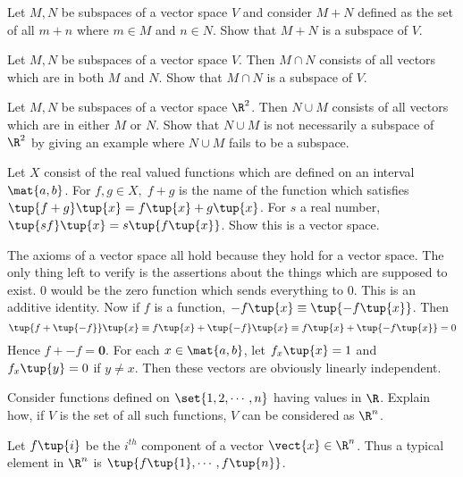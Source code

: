 \begin{enumialphparenastyle}
\begin{ex} Let $M,N$ be subspaces of a vector space $V$ and consider $M+N$
defined as the set of all $m+n$ where $m\in M$ and $n\in N$. Show that $M+N$
is a subspace of $V$.
\end{ex}

\begin{ex} Let $M,N$ be subspaces of a vector space $V$. Then $M\cap N$ consists
of all vectors which are in both $M$ and $N$. Show that $M\cap N$ is a
subspace of $V$.
\end{ex}

\begin{ex} Let $M,N$ be subspaces of a vector space $\R^{2}$. Then $N\cup
M$ consists of all vectors which are in either $M$ or $N$. Show that $N\cup
M $ is not necessarily a subspace of $\R^{2}$ by giving an example
where $N\cup M$ fails to be a subspace.
\end{ex}


\begin{ex} \label{4-july-prob1}Let $X$ consist of the real valued functions which
are defined on an interval $\mat{a,b}$. For $f,g\in X,\;f+g$ is the
name of the function which satisfies $\tup{f+g} \tup{x}
=f\tup{x} +g\tup{x}$. For $s$ a real number, $
\tup{s f} \tup{x} = s \tup{f\tup{x}
}$. Show this is a vector space. 
\begin{sol}
The axioms of a vector space all hold because they
hold for a vector space. The only thing left to verify is the
assertions about the things which are supposed to exist. $0$ would
be the zero function which sends everything to $0$. This is an additive
identity. Now if $f$ is a function, $-f\tup{x} \equiv \tup{
-f\tup{x} }$. Then
\[
\tup{f+\tup{-f} } \tup{x} \equiv f\tup{x}
+\tup{-f} \tup{x} \equiv f\tup{x} +\tup{-f\tup{
x} } =0
\]
Hence $f+-f=\mathbf{0}$. For each $x\in \mat{a,b}$, let $%
f_{x}\tup{x} =1$ and $f_{x}\tup{y} =0$ if $y\neq x$. Then
these vectors are obviously linearly independent.
\end{sol}
\end{ex}

\begin{ex} Consider functions defined on $\set{1,2,\cdots ,n} $ having
values in $\R$. Explain how, if $V$ is the set of all such
functions, $V$ can be considered as $\R^{n}$.
\begin{sol}
Let $f\tup{i} $ be the $i^{th}$ component of a vector $
\vect{x}\in \R^{n}$. Thus a typical element in $\R^{n}$ is $
\tup{f\tup{1} ,\cdots ,f\tup{n} }$.
\end{sol}
\end{ex}


\end{enumialphparenastyle}
